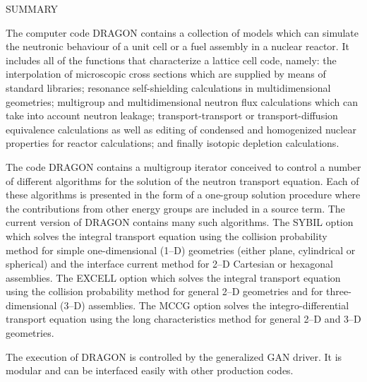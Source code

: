 \clearpage
$ $
\vskip 2.0cm

\begin{center}

SUMMARY

\end{center}

The computer code DRAGON contains a collection of models which can simulate the
neutronic behaviour of a unit cell or a fuel assembly in a nuclear reactor. It
includes all of the functions that characterize a lattice cell code, namely: the
interpolation of microscopic cross sections  which are supplied by means of
standard libraries; resonance self-shielding calculations in multidimensional
geometries; multigroup and multidimensional neutron flux calculations which can
take into account neutron leakage; transport-transport or transport-diffusion
equivalence calculations as well as editing of condensed and homogenized nuclear
properties for reactor calculations; and finally isotopic depletion calculations.

\vskip 0.15cm

The code DRAGON contains a multigroup iterator conceived to control a number of
different algorithms for the solution of the neutron transport equation. Each of
these algorithms is presented in the form of a one-group solution procedure
where the contributions from other energy groups are included in a source term.
The current version of DRAGON contains many such algorithms. The
SYBIL option which solves the integral transport equation using the collision
probability method for simple one-dimensional (1--D) geometries (either plane,
cylindrical or spherical) and the interface current method for 2--D Cartesian or hexagonal
assemblies. The EXCELL option which solves the integral transport equation
using the collision probability method for general 2--D geometries and for
three-dimensional (3--D) assemblies. The MCCG option solves the integro-differential
transport equation using the long characteristics method for general 2--D and
3--D geometries.

\vskip 0.15cm

The execution of DRAGON is controlled by the generalized GAN driver. It is
modular and can be interfaced easily with other production codes.
